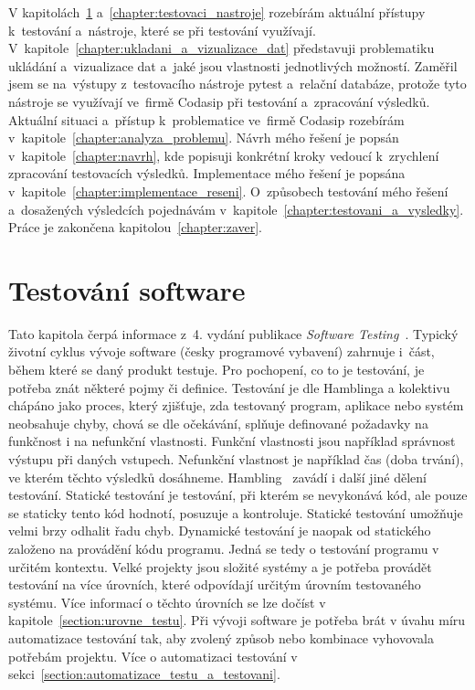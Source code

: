 V kapitolách~\ref{chapter:testovani_software} a~\ref{chapter:testovaci_nastroje} rozebírám aktuální přístupy k~testování a~nástroje, které se při testování využívají. V~kapitole~\ref{chapter:ukladani_a_vizualizace_dat}
představuji problematiku ukládání a~vizualizace dat a~jaké jsou vlastnosti jednotlivých možností.
Zaměřil jsem se na~výstupy z~testovacího nástroje pytest a~relační databáze, protože tyto nástroje se využívají
ve~firmě Codasip při testování a~zpracování výsledků. Aktuální situaci a~přístup k~problematice ve~firmě Codasip
rozebírám v~kapitole~\ref{chapter:analyza_problemu}. Návrh mého řešení je popsán v~kapitole~\ref{chapter:navrh}, kde popisuji konkrétní kroky vedoucí k~zrychlení zpracování testovacích výsledků. Implementace mého řešení je popsána v~kapitole~\ref{chapter:implementace_reseni}. O~způsobech testování mého řešení a~dosažených výsledcích pojednávám v~kapitole~\ref{chapter:testovani_a_vysledky}. Práce je zakončena kapitolou~\ref{chapter:zaver}.


\chapter{Testování software}
\label{chapter:testovani_software}
Tato kapitola čerpá informace z~4. vydání publikace \textit{Software Testing}~\cite{SoftwareTesting}. Typický životní cyklus vývoje software (česky programové vybavení) zahrnuje i~část, během které se daný produkt testuje. Pro pochopení, co to je testování, je potřeba znát některé pojmy či definice.
Testování je dle Hamblinga a kolektivu~\cite{SoftwareTesting} chápáno jako proces, který zjišťuje, zda testovaný program, aplikace nebo systém neobsahuje chyby, chová se dle očekávání, splňuje definované požadavky na funkčnost i na nefunkční vlastnosti.
Funkční vlastnosti jsou například správnost výstupu při daných vstupech. Nefunkční vlastnost je například čas (doba trvání), ve kterém těchto výsledků dosáhneme.
Hambling~\cite{SoftwareTesting} zavádí i další jiné dělení testování.
Statické testování je testování, při kterém se nevykonává kód, ale pouze se staticky tento kód hodnotí, posuzuje a kontroluje. Statické testování umožňuje velmi brzy odhalit řadu chyb. Dynamické testování je naopak od statického založeno na provádění kódu programu. Jedná se tedy o testování programu v určitém kontextu. Velké projekty jsou složité systémy a je potřeba provádět testování na více úrovních, které odpovídají určitým úrovním testovaného systému. Více informací o těchto úrovních se lze dočíst v kapitole~\ref{section:urovne_testu}. Při vývoji software je potřeba brát v úvahu míru automatizace testování tak, aby zvolený způsob nebo kombinace vyhovovala potřebám projektu. Více o automatizaci testování v sekci~\ref{section:automatizace_testu_a_testovani}.

